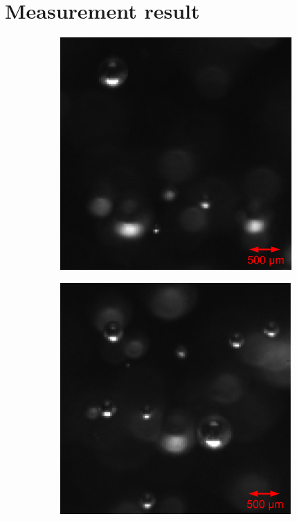 		
		
	\section{Measurement result}\label{measurement_results}
		\begin{figure}[h]			
			\begin{subfigure}[t]{.4\textwidth}
				\centering
				\includegraphics[scale=0.5]{images/aq_result_low_small_1.png}
				\caption{}
			\end{subfigure}\hfill
			\begin{subfigure}[t]{.4\textwidth}
				\centering
				\includegraphics[scale=0.5]{images/aq_result_low_small_2.png}
				\caption{}
			\end{subfigure}
			

\end{figure}
